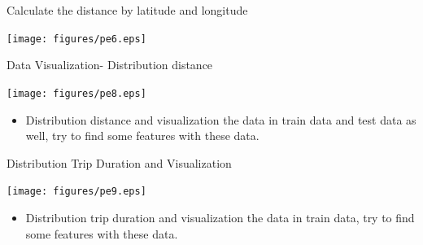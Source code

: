 \documentclass[
 size=14pt,
 paper=smartboard,  %
 mode=present, 		%
 display=slides, 	%
 style=tuliplab,  	%
 pauseslide,
 fleqn,leqno]{powerdot}
\begin{document}


\begin{slide}{Calculate the distance by latitude and longitude}
	{\begin{flushleft}
			\texttt{[image: figures/pe6.eps]}
		\end{flushleft}
	}
\end{slide}




\begin{slide}{Data Visualization- Distribution distance}
{\begin{flushleft}
		\texttt{[image: figures/pe8.eps]}
	\end{flushleft}
}

\begin{itemize}
	\item
	\smallskip
	Distribution distance and visualization the data in train data and test data as well, try to find some features with these data.

\end{itemize}
	
\end{slide}


\begin{slide}{Distribution Trip Duration and Visualization}
	{\begin{flushleft}
			\texttt{[image: figures/pe9.eps]}
		\end{flushleft}
	}

\begin{itemize}
	\item
	\smallskip
	Distribution trip duration and visualization the data in train data, try to find some features with these data.
	
\end{itemize}

\end{slide}
\end{document}

